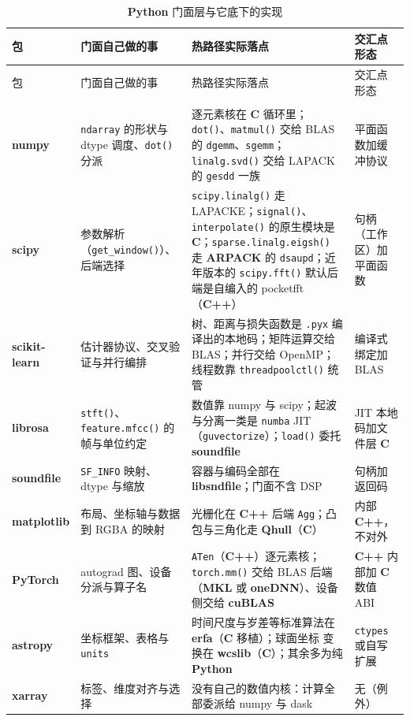 \documentclass[12pt,a4paper,fontset=fandol]{ctexbook}
\newcommand{\Fn}[1]{\texttt{#1()}}
\newcommand{\Tp}[1]{\texttt{#1}}
\newcommand{\Bk}{\allowbreak}
\newcommand{\Lib}[1]{\textbf{#1}}
\newcommand{\Lang}[1]{\textsf{\bfseries #1}}
\newcommand{\CL}{\Lang{C}}
\newcommand{\CPP}{\Lang{C++}}
\newcommand{\PY}{\Lang{Python}}
\begin{document}
\begin{longtable}{@{}>{\raggedright\arraybackslash}p{}
  >{\raggedright\arraybackslash}p{}
  >{\raggedright\arraybackslash}p{}
  >{\raggedright\arraybackslash}p{}@{}}
\caption{\PY{} 门面层与它底下的实现}\label{tab:ch16-under} \\
\toprule
包 & 门面自己做的事 & 热路径实际落点 & 交汇点形态 \\
\midrule
\endfirsthead
\toprule
包 & 门面自己做的事 & 热路径实际落点 & 交汇点形态 \\
\midrule
\endhead
\midrule
\multicolumn{4}{@{}r}{（接下页）}\\
\endfoot
\bottomrule
\endlastfoot
\Lib{numpy} & \Tp{ndarray} 的形状与 dtype 调度、\Fn{dot} 分派 &
  逐元素核在 \CL{} 循环里；\Fn{dot}、\Fn{matmul} 交给 BLAS 的
  \Tp{dgemm}、\Tp{sgemm}；\Fn{linalg.svd} 交给 LAPACK 的
  \Tp{gesdd} 一族 &
  平面函数加缓冲协议 \\
\Lib{scipy} & 参数解析（\Fn{get\_window}）、后端选择 &
  \Fn{scipy.linalg} 走 LAPACKE；\Fn{signal}、\Fn{interpolate}
  的原生模块是 \CL{}；\Fn{sparse.linalg\Bk.eigsh} 走 \Lib{ARPACK}
  的 \Tp{dsaupd}；近年版本的 \Fn{scipy.fft} 默认后端是自编入的
  pocketfft（\CPP{}） &
  句柄（工作区）加平面函数 \\
\Lib{scikit-learn} & 估计器协议、交叉验证与并行编排 &
  树、距离与损失函数是 \Tp{.pyx} 编译出的本地码；矩阵运算交给
  BLAS；并行交给 OpenMP；线程数靠 \Fn{threadpoolctl} 统管 &
  编译式绑定加 BLAS \\
\Lib{librosa} & \Fn{stft}、\Fn{feature.mfcc} 的帧与单位约定 &
  数值靠 numpy 与 scipy；起波与分离一类是 \Tp{numba} JIT
  （\Tp{guvectorize}）；\Fn{load} 委托 \Lib{soundfile} &
  JIT 本地码加文件层 \CL \\
\Lib{soundfile} & \Tp{SF\_INFO} 映射、dtype 与缩放 &
  容器与编码全部在 \Lib{libsndfile}；门面不含 DSP &
  句柄加返回码 \\
\Lib{matplotlib} & 布局、坐标轴与数据到 RGBA 的映射 &
  光栅化在 \CPP{} 后端 \Tp{Agg}；凸包与三角化走
  \Lib{Qhull}（\CL{}） &
  内部 \CPP{}，不对外 \\
\Lib{PyTorch} & autograd 图、设备分派与算子名 &
  \Tp{ATen}（\CPP{}）逐元素核；\Fn{torch.mm} 交给 BLAS 后端
  （\Lib{MKL} 或 \Lib{oneDNN}）、设备侧交给 \Lib{cuBLAS} &
  \CPP{} 内部加 \CL 数值 ABI \\
\Lib{astropy} & 坐标框架、表格与 \Tp{units} &
  时间尺度与岁差等标准算法在 \Lib{erfa}（\CL{} 移植）；球面坐标
  变换在 \Lib{wcslib}（\CL{}）；其余多为纯 \PY{} &
  \Tp{ctypes} 或自写扩展 \\
\Lib{xarray} & 标签、维度对齐与选择 &
  没有自己的数值内核：计算全部委派给 numpy 与 dask &
  无（例外） \\
\end{longtable}
\end{document}
